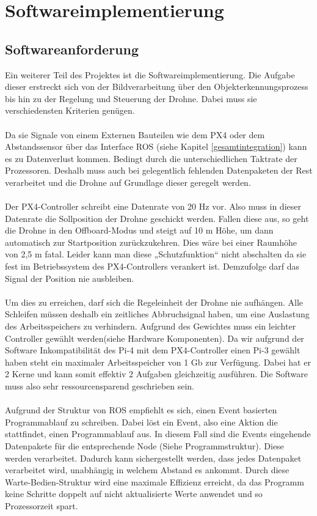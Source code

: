 \chapter{Softwareimplementierung}
\section{Softwareanforderung}
Ein weiterer Teil des Projektes ist die Softwareimplementierung. Die Aufgabe dieser erstreckt sich von der Bildverarbeitung über den Objekterkennungsprozess bis hin zu der Regelung und Steuerung der Drohne. Dabei muss sie verschiedensten Kriterien genügen.\\
\\
Da sie Signale von einem Externen Bauteilen wie dem PX4 oder dem Abstandssensor über das Interface ROS (siehe Kapitel \ref{gesamtintegration}) kann es zu Datenverlust kommen. Bedingt durch die unterschiedlichen Taktrate der Prozessoren. Deshalb muss auch bei gelegentlich fehlenden Datenpaketen der Rest verarbeitet und die Drohne auf Grundlage dieser geregelt werden.\\
\\
Der PX4-Controller schreibt eine Datenrate von 20 Hz vor. Also muss in dieser Datenrate die Sollposition der Drohne geschickt werden. Fallen diese aus, so geht die Drohne in den Offboard-Modus und steigt auf 10 m Höhe, um dann automatisch zur Startposition zurückzukehren. Dies wäre bei einer Raumhöhe von 2,5 m fatal. Leider kann man diese „Schutzfunktion“ nicht abschalten da sie fest im Betriebssystem des PX4-Controllers verankert ist. Demzufolge darf das Signal der Position nie ausbleiben.\\
\\
Um dies zu erreichen, darf sich die Regeleinheit der Drohne nie aufhängen. Alle Schleifen müssen deshalb ein zeitliches Abbruchsignal haben, um eine Auslastung des Arbeitsspeichers zu verhindern. Aufgrund des Gewichtes muss ein leichter Controller gewählt werden(siehe Hardware Komponenten). Da wir aufgrund der Software Inkompatibilität des Pi-4 mit dem PX4-Controller einen Pi-3 gewählt haben steht ein maximaler Arbeitsspeicher von 1 Gb zur Verfügung. Dabei hat er 2 Kerne und kann somit effektiv 2 Aufgaben gleichzeitig ausführen. Die Software muss also sehr ressourcensparend geschrieben sein.\\
\\
Aufgrund der Struktur von ROS empfiehlt es sich, einen Event basierten Programmablauf zu schreiben. Dabei löst ein Event, also eine Aktion die stattfindet, einen Programmablauf aus. In diesem Fall sind die Events eingehende Datenpakete für die entsprechende Node (Siehe Programmstruktur). Diese werden verarbeitet. Dadurch kann sichergestellt werden, dass jedes Datenpaket verarbeitet wird, unabhängig in welchem Abstand es ankommt. Durch diese Warte-Bedien-Struktur wird eine maximale Effizienz erreicht, da das Programm keine Schritte doppelt auf nicht aktualisierte Werte anwendet und so Prozessorzeit spart.
